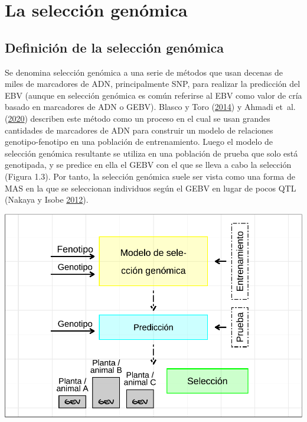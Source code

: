 \documentclass[11pt,spanish,a4paper,oneside,]{book} %
\begin{document}
\hypertarget{la-selecciuxf3n-genuxf3mica}{%
\section{La selección genómica}\label{la-selecciuxf3n-genuxf3mica}}

\hypertarget{definiciuxf3n-de-la-selecciuxf3n-genuxf3mica}{%
\subsection{Definición de la selección genómica}\label{definiciuxf3n-de-la-selecciuxf3n-genuxf3mica}}

Se denomina selección genómica a una serie de métodos que usan decenas de miles de marcadores de ADN, principalmente SNP, para realizar la predicción del EBV (aunque en selección genómica es común referirse al EBV como valor de cría basado en marcadores de ADN o GEBV). Blasco y Toro (\protect\hyperlink{ref-cite:3}{2014}) y Ahmadi et~al. (\protect\hyperlink{ref-cite:33}{2020}) describen este método como un proceso en el cual se usan grandes cantidades de marcadores de ADN para construir un modelo de relaciones genotipo-fenotipo en una población de entrenamiento. Luego el modelo de selección genómica resultante se utiliza en una población de prueba que solo está genotipada, y se predice en ella el GEBV con el que se lleva a cabo la selección (Figura 1.3). Por tanto, la selección genómica suele ser vista como una forma de MAS en la que se seleccionan individuos según el GEBV en lugar de pocos QTL (Nakaya y Isobe \protect\hyperlink{ref-cite:6}{2012}).

\begin{center}\includegraphics[width=1\linewidth]{figures/GS} \end{center}
\end{document}
